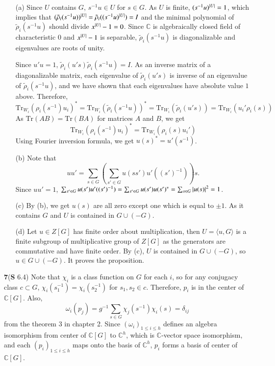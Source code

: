 \documentclass[a4paper, 12pt]{article}
\theoremstyle{Mydefinition}
\theoremstyle{Mytheorem}
\begin{document}
\begin{enumerate}
    \item[(a)] Since $U$ contains $G$, $s^{-1}u\in U$ for $s\in G$. As $U$ is finite, $(s^{-1}u)^{\abs{U}} = 1$, which implies that $(\tilde{\rho}_i(s^{-1}u))^{\abs{U}} = \tilde{\rho}_i((s^{-1}u)^{\abs{U}}) = I$ and the minimal polynomial of $\tilde{\rho}_i(s^{-1}u)$ should divide $x^{\abs{U}}-1 = 0$. Since $\mathbb{C}$ is algebraically closed field of characteristic $0$ and $x^{\abs{U}}-1$ is separable, $\tilde{\rho}_i(s^{-1}u)$ is diagonalizable and eigenvalues are roots of unity.

    Since $u'u = 1$, $\tilde{\rho}_i(u's)\tilde{\rho}_i(s^{-1}u) = I$. As an inverse matrix of a diagonalizable matrix, each eigenvalue of $\tilde{\rho}_i(u's)$ is inverse of an eigenvalue of $\tilde{\rho}_i(s^{-1}u)$, and we have shown that each eigenvalues have absolute value $1$ above. Therefore,
    \begin{equation}
        \mathrm{Tr}_{W_i}(\rho_i(s^{-1})u_i)^* = \mathrm{Tr}_{W_i}(\tilde{\rho}_i(s^{-1}u))^* = \mathrm{Tr}_{W_i}(\tilde{\rho}_i(u's)) = \mathrm{Tr}_{W_i}(u_i'\rho_i(s))
    \end{equation}
    As $\mathrm{Tr}(AB) = \mathrm{Tr}(BA)$ for matrices $A$ and $B$, we get
    \begin{equation}
        \mathrm{Tr}_{W_i}(\rho_i(s^{-1})u_i)^* = \mathrm{Tr}_{W_i}(\rho_i(s)u_i')
    \end{equation}
    Using Fourier inversion formula, we get $u(s)^* = u'(s^{-1})$.
    \item[(b)] Note that
    \begin{equation}
        uu' = \sum_{s\in G}\left(\sum_{s'\in G}u(ss')u'((s')^{-1})\right)s.
    \end{equation}
    Since $uu' = 1$, $\sum_{s'\in G}u(s')u'((s')^{-1}) = \sum_{s'\in G}u(s')u(s')^*  = \sum_{s\in G}\abs{u(s)}^2= 1$.
    \item[(c)] By (b), we get $u(s)$ are all zero except one which is equal to $\pm 1$. As it contains $G$ and $U$ is contained in $G\cup (-G)$.
    \item[(d)] Let $u\in Z[G]$ has finite order about multiplication, then $U = \langle u, G\rangle$ is a finite subgroup of multiplicative group of $Z[G]$ as the generators are commutative and have finite order. By (c), $U$ is contained in $G\cup (-G)$, so $u\in G\cup (-G)$. It proves the proposition.
\end{enumerate}

\noindent \textbf{7}(\textbf{S} 6.4)
Note that $\chi_i$ is a class function on $G$ for each $i$, so for any conjugacy class $c\subset G$, $\chi_i(s^{-1}_1)=\chi_i(s^{-1}_2)$ for $s_1,s_2\in c$. Therefore, $p_i$ is in the center of $\mathbb{C}[G]$. Also,
\begin{equation}
    \omega_i(p_j) = g^{-1}\sum_{s\in G}\chi_j(s^{-1})\chi_i(s) = \delta_{ij}
\end{equation}
from the theorem 3 in chapter 2. Since $(\omega_i)_{1\leq i\leq h}$ defines an algebra isomorphism from center of $\mathbb{C}[G]$ to $\mathbb{C}^h$, which is $\mathbb{C}$-vector space isomorphism, and each $(p_i)_{1\leq i\leq h}$ maps onto the basis of $\mathbb{C}^h$, $p_i$ forms a basis of center of $\mathbb{C}[G]$.
\end{document}
